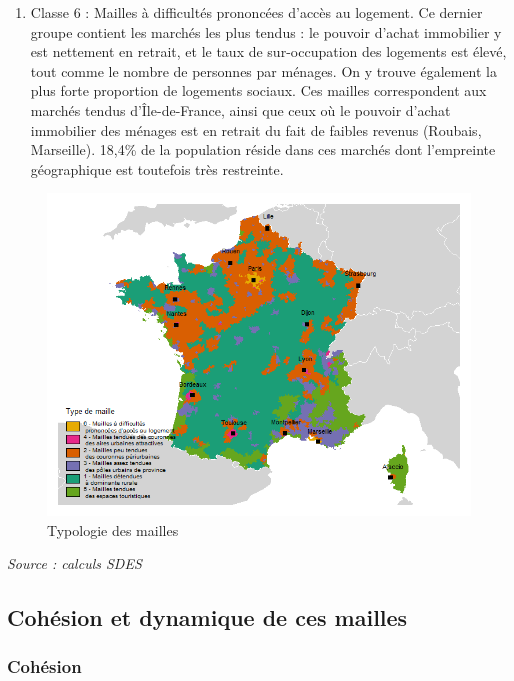\documentclass[12pt, a4paper]{article}
\begin{document}
\begin{enumerate}
\item Classe 6 : Mailles à difficultés prononcées d'accès au logement. Ce dernier groupe contient les marchés les plus tendus : le pouvoir d'achat immobilier y est nettement en retrait, et le taux de sur-occupation des logements est élevé, tout comme le nombre de personnes par ménages. On y trouve également la plus forte proportion de logements sociaux. Ces mailles correspondent aux marchés tendus d'Île-de-France, ainsi que ceux où le pouvoir d'achat immobilier des ménages est en retrait du fait de faibles revenus (Roubais, Marseille). 18,4\% de la population réside dans ces marchés dont l'empreinte géographique est toutefois très restreinte.
\end{enumerate}

\begin{figure}[H]
\caption{Typologie des mailles}
\begin{center}
\includegraphics[scale=.8]{img/Typo_mailles.png}
\end{center}
\end{figure}
\emph{Source : calculs SDES}

\subsection{Cohésion et dynamique de ces mailles}

\subsubsection{Cohésion}
\end{document}
